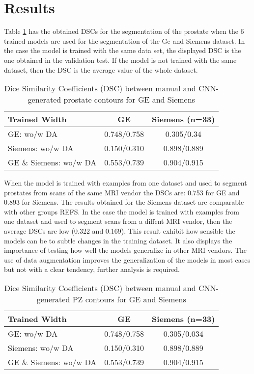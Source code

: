 \section{Results}

Table \ref{tab:res_prost} has the obtained DSCs for the segmentation of the prostate
when the 6 trained models are used for the segmentation of the Ge and Siemens dataset. 
In the case the model is trained with the same data set, the displayed DSC is the one
obtained in the validation test. If the model is not trained with the same
dataset, then the DSC is the average value of the whole dataset. 
\begin{table}[h]
    \centering
    \begin{tabular}{|l|c|c|}
         \hline
          \textbf{Trained Width} &  GE & Siemens (n=33) \\
         \hline
         GE: wo/w DA & 0.748/0.758 & 0.305/0.34 \\
         \hline
         Siemens: wo/w DA & 0.150/0.310 & 0.898/0.889\\
         \hline
         GE \& Siemens: wo/w DA & 0.553/0.739 & 0.904/0.915\\
         \hline
    \end{tabular}
    \caption{Dice Similarity Coefficients (DSC) between manual and CNN-generated 
    prostate contours for GE and Siemens}
    \label{tab:res_prost}
\end{table}
When the model is trained with examples from one dataset and used to segment
prostates from scans of the same MRI vendor the DSCs are: 0.753 for GE and 0.893  for Siemens. 
The results obtained for the Siemens dataset are comparable with 
other groups REFS.  In the case the model is trained with examples from 
one dataset and used to segment scans from a diffent MRI vendor, then the
 average DSCs are low (0.322 and 0.169). This result exhibit how sensible the models
can be to subtle changes in the training dataset. It also displays the importance 
of testing how well the models generalize in other MRI vendors. 
The use of data augmentation improves the generalization of the models in most cases
but not with a clear tendency, further analysis is required. 

\begin{table}
    \centering
    \begin{tabular}{|l|c|c|}
        \hline
         \textbf{Trained Width} &  GE & Siemens (n=33) \\
         \hline
         GE: wo/w DA & 0.748/0.758 & 0.305/0.034 \\
         \hline
         Siemens: wo/w DA & 0.150/0.310 & 0.898/0.889\\
         \hline
         GE \& Siemens: wo/w DA & 0.553/0.739 & 0.904/0.915\\
         \hline
    \end{tabular}
    \caption{Dice Similarity Coefficients (DSC) between manual and CNN-generated 
    PZ contours for GE and Siemens}
    \label{tab:res_pz}
\end{table}
